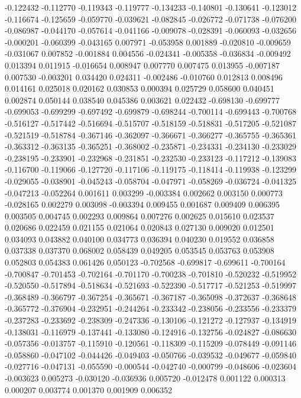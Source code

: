 -0.122432
-0.112770
-0.119343
-0.119777
-0.134233
-0.140801
-0.130641
-0.123012
-0.116674
-0.125659
-0.059770
-0.039621
-0.082845
-0.026772
-0.071738
-0.076200
-0.086987
-0.044170
-0.057614
-0.041166
-0.009078
-0.028391
-0.060093
-0.032656
-0.000201
-0.060399
-0.043165
0.007971
-0.053958
0.001889
-0.020810
-0.009659
-0.031067
0.007852
-0.001884
0.004556
-0.024341
-0.005358
-0.036834
-0.009492
0.013394
0.011915
-0.016654
0.008947
0.007770
0.007475
0.013955
-0.007187
0.007530
-0.003201
0.034420
0.024311
-0.002486
-0.010760
0.012813
0.008496
0.014161
0.025018
0.020162
0.030853
0.000394
0.025729
0.058600
0.040451
0.002874
0.050144
0.038540
0.045386
0.003621
0.022432
-0.698130
-0.699777
-0.699053
-0.699299
-0.697492
-0.699879
-0.698244
-0.700114
-0.699443
-0.700768
-0.516127
-0.517442
-0.516694
-0.515707
-0.518159
-0.518831
-0.517205
-0.521087
-0.521519
-0.518784
-0.367146
-0.362097
-0.366671
-0.366277
-0.365755
-0.365361
-0.363312
-0.363135
-0.365251
-0.368002
-0.235871
-0.234331
-0.234130
-0.233029
-0.238195
-0.233901
-0.232968
-0.231851
-0.232530
-0.233123
-0.117212
-0.139083
-0.116700
-0.119066
-0.127720
-0.117106
-0.119175
-0.118414
-0.119938
-0.123299
-0.029055
-0.038901
-0.045243
-0.058704
-0.047971
-0.058269
-0.036724
-0.041325
-0.047213
-0.052264
0.001611
0.003299
-0.003384
0.002662
0.003150
0.000773
-0.028165
0.002279
0.003098
-0.003394
0.009455
0.001687
0.009409
0.006395
0.003505
0.004745
0.002293
0.009864
0.007276
0.002625
0.015610
0.023537
0.020686
0.022459
0.021155
0.021064
0.020843
0.027130
0.009020
0.012501
0.034093
0.043882
0.040100
0.034773
0.036394
0.040230
0.019552
0.036858
0.037338
0.037370
0.068002
0.058439
0.049205
0.053545
0.053763
0.053908
0.052803
0.054383
0.061426
0.050123
-0.702568
-0.699817
-0.699611
-0.700164
-0.700847
-0.701453
-0.702164
-0.701170
-0.700238
-0.701810
-0.520232
-0.519952
-0.520550
-0.517894
-0.518634
-0.521693
-0.522390
-0.517717
-0.521253
-0.519997
-0.368489
-0.366797
-0.367254
-0.365671
-0.367187
-0.365098
-0.372637
-0.368648
-0.365772
-0.376904
-0.232951
-0.244264
-0.233342
-0.238056
-0.233556
-0.233379
-0.237283
-0.233692
-0.238309
-0.247336
-0.130106
-0.121272
-0.127937
-0.134919
-0.138031
-0.116979
-0.137441
-0.133080
-0.124916
-0.132756
-0.024827
-0.086630
-0.057356
-0.013757
-0.115910
-0.120561
-0.118309
-0.115209
-0.078449
-0.091146
-0.058860
-0.047102
-0.044426
-0.049403
-0.050766
-0.039532
-0.049677
-0.059840
-0.027716
-0.047131
-0.055590
-0.000544
-0.042740
-0.000799
-0.048606
-0.023604
-0.003623
0.005273
-0.030120
-0.036936
0.005720
-0.012478
0.001122
0.000313
0.000207
0.003774
0.001370
0.001909
0.006352
